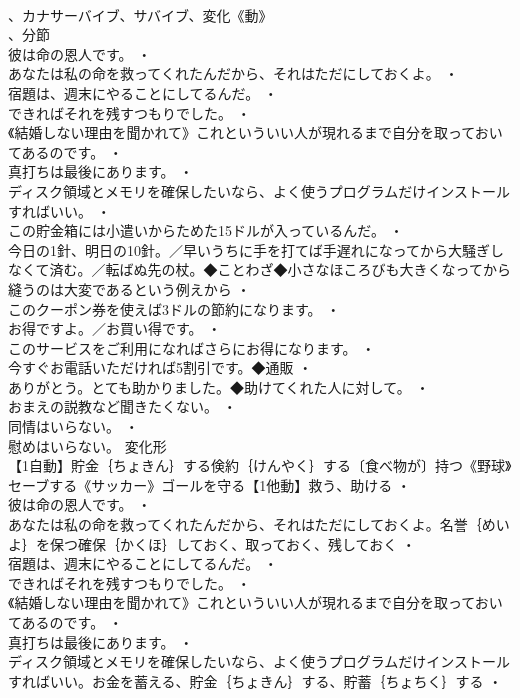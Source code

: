 \documentclass[8pt]{extreport}
\begin{document}
\begin{CJK}{UTF8}{min}
\\	、カナサーバイブ、サバイブ、変化《動》
\\	、分節
\\	彼は命の恩人です。 ・
\\	あなたは私の命を救ってくれたんだから、それはただにしておくよ。 ・
\\	宿題は、週末にやることにしてるんだ。 ・
\\	できればそれを残すつもりでした。 ・
\\	《結婚しない理由を聞かれて》これといういい人が現れるまで自分を取っておいてあるのです。 ・
\\	真打ちは最後にあります。 ・
\\	ディスク領域とメモリを確保したいなら、よく使うプログラムだけインストールすればいい。 ・
\\	この貯金箱には小遣いからためた15ドルが入っているんだ。 ・
\\	今日の1針、明日の10針。／早いうちに手を打てば手遅れになってから大騒ぎしなくて済む。／転ばぬ先の杖。◆ことわざ◆小さなほころびも大きくなってから縫うのは大変であるという例えから ・
\\	このクーポン券を使えば3ドルの節約になります。 ・
\\	お得ですよ。／お買い得です。 ・
\\	このサービスをご利用になればさらにお得になります。 ・
\\	今すぐお電話いただければ5割引です。◆通販 ・
\\	ありがとう。とても助かりました。◆助けてくれた人に対して。 ・
\\	おまえの説教など聞きたくない。 ・
\\	同情はいらない。 ・
\\	慰めはいらない。	変化形 
\\	【1自動】貯金｛ちょきん｝する倹約｛けんやく｝する〔食べ物が〕持つ《野球》セーブする《サッカー》ゴールを守る【1他動】救う、助ける ・
\\	彼は命の恩人です。 ・
\\	あなたは私の命を救ってくれたんだから、それはただにしておくよ。名誉｛めいよ｝を保つ確保｛かくほ｝しておく、取っておく、残しておく ・
\\	宿題は、週末にやることにしてるんだ。 ・
\\	できればそれを残すつもりでした。 ・
\\	《結婚しない理由を聞かれて》これといういい人が現れるまで自分を取っておいてあるのです。 ・
\\	真打ちは最後にあります。 ・
\\	ディスク領域とメモリを確保したいなら、よく使うプログラムだけインストールすればいい。お金を蓄える、貯金｛ちょきん｝する、貯蓄｛ちょちく｝する ・

\end{CJK}
\end{document}

